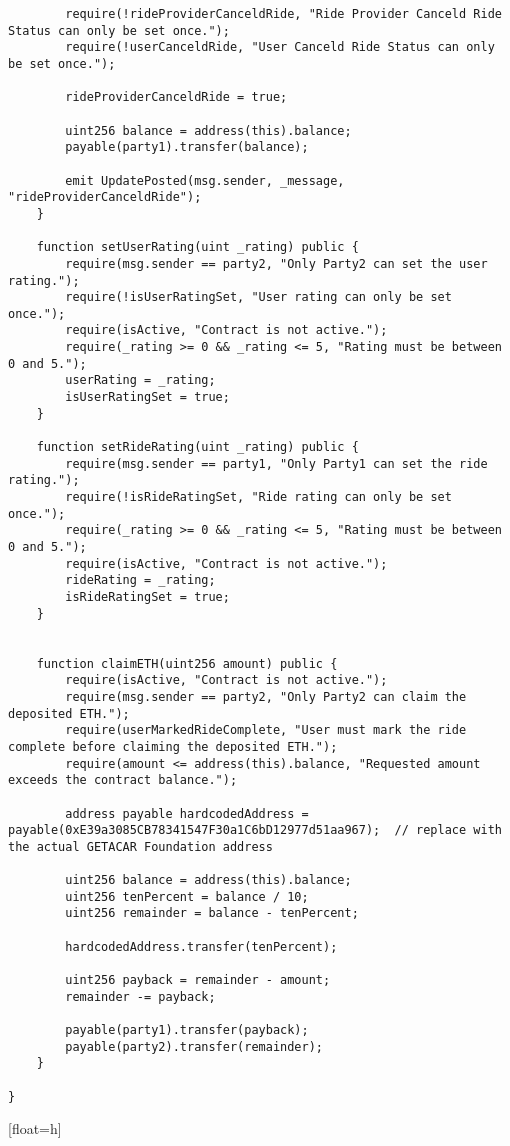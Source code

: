 \begin{lstlisting}
        require(!rideProviderCanceldRide, "Ride Provider Canceld Ride Status can only be set once.");
        require(!userCanceldRide, "User Canceld Ride Status can only be set once.");

        rideProviderCanceldRide = true;

        uint256 balance = address(this).balance;
        payable(party1).transfer(balance);
        
        emit UpdatePosted(msg.sender, _message, "rideProviderCanceldRide");
    }

    function setUserRating(uint _rating) public {
        require(msg.sender == party2, "Only Party2 can set the user rating.");
        require(!isUserRatingSet, "User rating can only be set once.");
        require(isActive, "Contract is not active.");
        require(_rating >= 0 && _rating <= 5, "Rating must be between 0 and 5.");
        userRating = _rating;
        isUserRatingSet = true;
    }

    function setRideRating(uint _rating) public {
        require(msg.sender == party1, "Only Party1 can set the ride rating.");
        require(!isRideRatingSet, "Ride rating can only be set once.");
        require(_rating >= 0 && _rating <= 5, "Rating must be between 0 and 5.");
        require(isActive, "Contract is not active.");
        rideRating = _rating;
        isRideRatingSet = true;
    }


    function claimETH(uint256 amount) public {
        require(isActive, "Contract is not active.");
        require(msg.sender == party2, "Only Party2 can claim the deposited ETH.");
        require(userMarkedRideComplete, "User must mark the ride complete before claiming the deposited ETH.");
        require(amount <= address(this).balance, "Requested amount exceeds the contract balance.");
        
        address payable hardcodedAddress = payable(0xE39a3085CB78341547F30a1C6bD12977d51aa967);  // replace with the actual GETACAR Foundation address

        uint256 balance = address(this).balance;
        uint256 tenPercent = balance / 10;
        uint256 remainder = balance - tenPercent;

        hardcodedAddress.transfer(tenPercent);

        uint256 payback = remainder - amount;
        remainder -= payback;

        payable(party1).transfer(payback);
        payable(party2).transfer(remainder);
    }

}
\end{lstlisting}[float=h]
